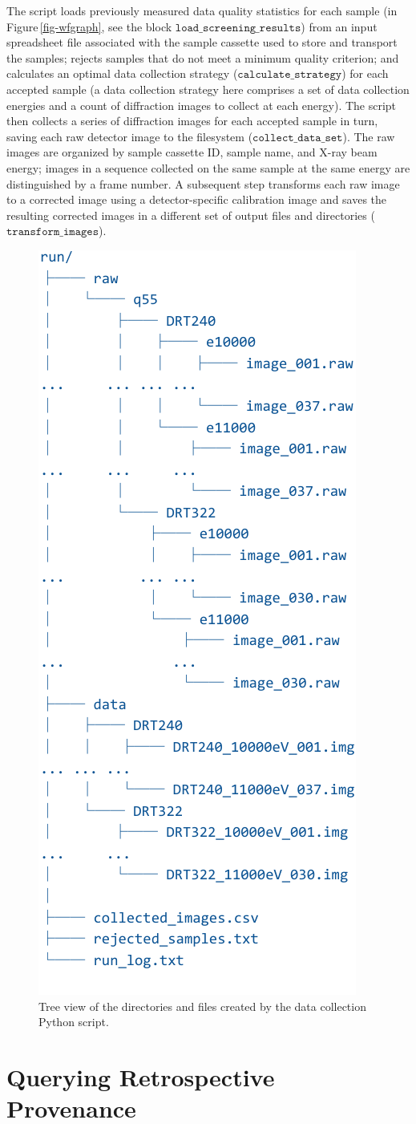 \documentclass[nocopyrightspace]{sigplanconf}
\newcommand{\Figref}[1]{Figure\,\ref{#1}}
\newcommand{\code}[1]{\ensuremath{\mathtt{#1}}}
\begin{document}
The script loads previously measured data quality statistics for each
sample (in \Figref{fig-wfgraph}, see the block
\code{load\_screening\_results}) from an input spreadsheet file
associated with the sample cassette used to store and transport the
samples; rejects samples that do not meet a minimum quality criterion;
and calculates an optimal data collection strategy
(\code{calculate\_strategy}) for each accepted sample (a data
collection strategy here comprises a set of data collection energies
and a count of diffraction images to collect at each energy). The
script then collects a series of diffraction images for each accepted
sample in turn, saving each raw detector image to the filesystem
(\code{collect\_data\_set}). The raw images are organized by sample
cassette ID, sample name, and X-ray beam energy; images in a sequence
collected on the same sample at the same energy are distinguished by a
frame number. A subsequent step transforms each raw image to a
corrected image using a detector-specific calibration image and saves
the resulting corrected images in a different set of output files and
directories (\code{transform\_images}).

\begin{figure}[t]
  \centering
  \includegraphics[width=.3\textwidth]{tree-abbrev-crop.pdf}
  \nocaptionrule
  \caption{Tree view of the directories and files created by
    the data collection Python script.}
  \label{fig-data-tree}
\end{figure}

%

\section{Querying Retrospective Provenance} 
\label{sec:queries}
\end{document}
